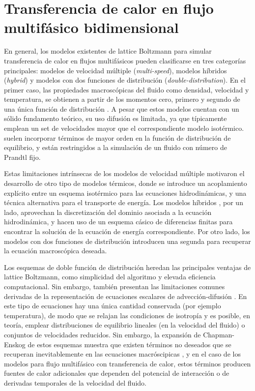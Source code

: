 \chapter{Transferencia de calor en flujo multif\'asico bidimensional}
\label{chap:modelo2D}

En general, los modelos existentes de lattice Boltzmann para simular transferencia de calor en flujos multif\'asicos pueden clasificarse en tres categor\'ias principales: modelos de velocidad m\'ultiple (\emph{multi-speed}), modelos h\'ibridos (\emph{hybrid}) y modelos con dos funciones de distribuci\'on (\emph{double-distribution}). En el primer caso, las propiedades macrosc\'opicas del fluido como densidad, velocidad y temperatura, se obtienen a partir de los momentos cero, primero y segundo de una \'unica funci\'on de distribuci\'on \cite{alexander_lattice_1993,succi_lattice_2018}. A pesar que estos modelos cuentan con un s\'olido fundamento te\'orico, su uso difusi\'on es limitada, ya que t\'ipicamente emplean un set de velocidades mayor que el correspondiente modelo isot\'ermico. suelen incorporar t\'erminos de mayor orden en la funci\'on de distribuci\'on de equilibrio, y est\'an restringidos a la simulaci\'on de un fluido con n\'umero de Prandtl fijo.

Estas limitaciones intr\'insecas de los modelos de velocidad m\'ultiple motivaron el desarrollo de otro tipo de modelos t\'ermicos, donde se introduce un acoplamiento expl\'icito entre un esquema isot\'ermico para las ecuaciones hidrodin\'amicas, y una t\'ecnica alternativa para el transporte de energ\'ia. Los modelos h\'ibridos \cite{dong_numerical_2012,li_lattice_2015}, por un lado, aprovechan la discretizaci\'on del dominio asociada a la ecuaci\'on hidrodin\'amica, y hacen uso de un esquema c\'asico de diferencias finitas para encontrar la soluci\'on de la ecuaci\'on de energ\'ia correspondiente. Por otro lado, los modelos con dos funciones de distribuci\'on introducen una segunda \lbe{} para recuperar la ecuaci\'on macrosc\'opica deseada.

Los esquemas de doble funci\'on de distribuci\'on heredan las principales ventajas de lattice Boltzmann, como simplicidad del algoritmo y elevada eficiencia computacional. Sin embargo, tambi\'en presentan las limitaciones comunes derivadas de la representaci\'on de ecuaciones escalares de advecci\'on-difusi\'on \cite{markus_simulation_2011, huang_modified_2014, li_improved_2017, huang_numerical_2011, li_effect_2014, huang_multiphase_2015}. En este tipo de ecuaciones hay una \'unica cantidad conservada (por ejemplo temperatura), de modo que se relajan las condiciones de isotrop\'ia y es posible, en teor\'ia, emplear distribuciones de equilibrio lineales (en la velocidad del fluido) o conjuntos de velocidades reducidos. Sin embargo, la expansi\'on de Chapman-Enskog de estos esquemas muestra que existen t\'erminos no deseados que se recuperan inevitablemente en las ecuaciones macr\'oscipicas \cite{huang_modified_2014, huang_numerical_2011, kruger_lattice_2017}, y en el caso de los modelos para flujo multif\'asico con transferencia de calor, estos t\'erminos producen fuentes de calor adicionales que dependen del potencial de interacci\'on o de derivadas temporales de la velocidad del fluido.

